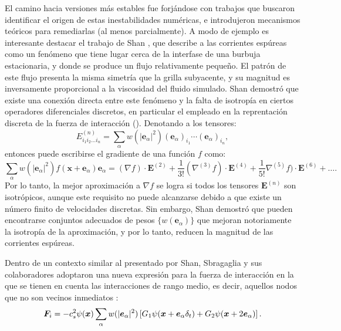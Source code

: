 El camino hacia versiones m\'as estables fue forj\'andose con trabajos que buscaron identificar el origen de estas inestabilidades num\'ericas, e introdujeron mecanismos te\'oricos para remediarlas (al menos parcialmente). A modo de ejemplo es interesante destacar el trabajo de Shan \cite{shan_analysis_2006}, que describe a las corrientes esp\'ureas como un fen\'omeno que tiene lugar cerca de la interfase de una burbuja estacionaria, y donde se produce un flujo relativamente peque\~no. El patr\'on de este flujo presenta la misma simetr\'ia que la grilla subyacente, y su magnitud es inversamente proporcional a la viscosidad del fluido simulado. Shan demostr\'o que existe una conexi\'on directa entre este fen\'omeno y la falta de isotrop\'ia en ciertos operadores diferenciales discretos, en particular el empleado en la reprentaci\'on discreta de la fuerza de interacci\'on (). Denotando a los tensores: 
\begin{equation}
	E^{(n)}_{i_1i_2\ldots i_n} = \sum_{\alpha}w(|\bm{e}_{\alpha}|^2)(\bm{e}_{\alpha})_{i_1} \cdots (\bm{e}_{\alpha})_{i_n},
\end{equation}
entonces puede escribirse el gradiente de una funci\'on $f$ como:
\begin{equation}
	\sum_{\alpha}w(|\bm{e}_{\alpha}|^2) f(\bm{x}+\bm{e}_{\alpha})\bm{e}_{\alpha}=(\nabla f)\cdot \bm{E}^{(2)} + \dfrac{1}{3!}(\nabla^{(3)} f)\cdot \bm{E}^{(4)} + \dfrac{1}{5!}\nabla^{(5)} f)\cdot \bm{E}^{(6)} + \ldots.
\end{equation}
Por lo tanto, la mejor aproximaci\'on a $\nabla f$ se logra si todos los tensores $\bm{E}^{(n)}$ son isotr\'opicos, aunque este requisito no puede alcanzarse debido a que existe un n\'umero finito de  velocidades discretas. Sin embargo, Shan demostr\'o que pueden encontrarse conjuntos adecuados de pesos $\{ w(\bm{e}_{\alpha})\}$ que mejoran notoriamente la isotrop\'ia de la aproximaci\'on, y por lo tanto, reducen la magnitud de las corrientes esp\'ureas.

Dentro de un contexto similar al presentado por Shan, Sbragaglia y sus colaboradores adoptaron una nueva expresi\'on para la fuerza de interacci\'on en la que se tienen en cuenta las interacciones de rango medio, es decir, aquellos nodos que no son vecinos inmediatos \cite{sbragaglia_generalized_2007}:
\begin{equation}
	\bm{F}_i = -c_s^2 \psi(\bm{x}) \sum_{\alpha} w(|\bm{e}_{\alpha}|^2) \left[G_1 \psi(\bm{x} + \bm{e}_{\alpha}\delta_t)  + G_2 \psi(\bm{x}+2\bm{e}_{\alpha}) \right].
	\label{eq:fi_sbragaglia}
\end{equation}


